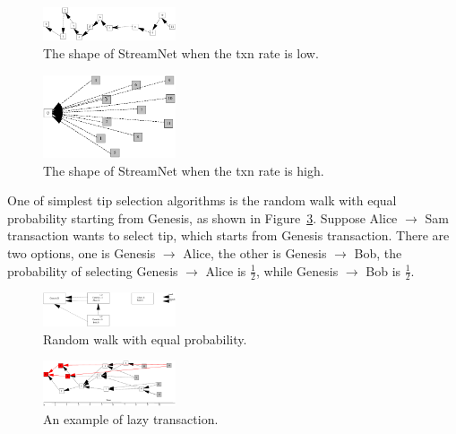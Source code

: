 \begin{figure}[!ht]
\begin{center}
\includegraphics[width=0.35\textwidth]{figures/slow_txn.eps}
    \caption{
        The shape of StreamNet when the txn rate is low. 
     }
\label{slow_txn}
\end{center}
\end{figure}

\begin{figure}[!ht]
\begin{center}
\includegraphics[width=0.35\textwidth]{figures/fast_txn.eps}
    \caption{
        The shape of StreamNet when the txn rate is high. 
     }
\label{fast_txn}
\end{center}
\end{figure}

One of simplest tip selection algorithms is the random walk with equal probability starting from Genesis, as shown in Figure~\ref{random_equal}.
Suppose Alice $\rightarrow$ Sam transaction wants to select tip, which starts from Genesis transaction.
There are two options, one is Genesis $\rightarrow$ Alice, the other is Genesis $\rightarrow$ Bob,
the probability of selecting Genesis $\rightarrow$ Alice is $\frac{1}{2}$, while Genesis $\rightarrow$ Bob is $\frac{1}{2}$. 

\begin{figure}[!ht]
\begin{center}
\includegraphics[width=0.35\textwidth]{figures/random_equal.eps}
    \caption{
        Random walk with equal probability.
     }
\label{random_equal}
\end{center}
\end{figure}

\begin{figure}[!ht]
\begin{center}
\includegraphics[width=0.35\textwidth]{figures/lazy_txn.eps}
    \caption{
        An example of lazy transaction.
     }
\label{lazy_txn}
\end{center}
\end{figure}

